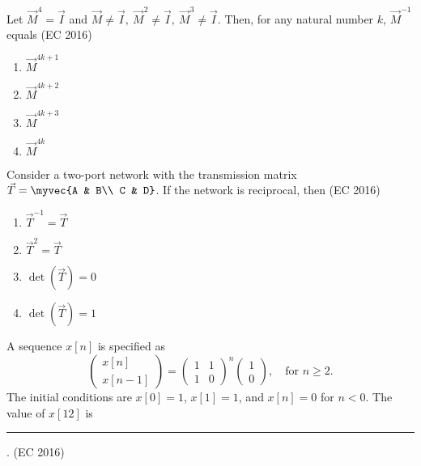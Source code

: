 \item Let $\vec{M}^4 = \vec{I}$  and $\vec{M} \neq \vec{I},\ \vec{M}^2 \neq \vec{I},\ \vec{M}^3 \neq \vec{I}$. Then, for any natural number $k$, $\vec{M}^{-1}$ equals
\hfill(EC 2016)

\begin{multicols}{4}
\begin{enumerate}
    \item $\vec{M}^{4k+1}$
    \item $\vec{M}^{4k+2}$
    \item $\vec{M}^{4k+3}$
    \item $\vec{M}^{4k}$
\end{enumerate}
\end{multicols}
\item Consider a two-port network with the transmission matrix $\vec{T}=\myvec{A & B\\ C & D}$. If the network is reciprocal, then
 \hfill(EC 2016)
\begin{multicols}{4}
\begin{enumerate}
    \item $\vec{T}^{-1}=\vec{T}$
    \item $\vec{T}^2 = \vec{T}$
    \item \(\det(\vec{T})=0\)
    \item \(\det(\vec{T})=1\)
\end{enumerate}
\end{multicols}
\item A sequence $x[n]$ is specified as
\[
\begin{pmatrix} x[n] \\ x[n-1] \end{pmatrix}
=
\begin{pmatrix} 1 & 1 \\ 1 & 0 \end{pmatrix}^n
\begin{pmatrix} 1 \\ 0 \end{pmatrix}, \quad \text{for } n\ge 2.
\]
The initial conditions are $x[0]=1$, $x[1]=1$, and $x[n]=0$ for $n<0$. The value of $x[12]$ is \rule{3cm}{0.4pt}.
\hfill(EC 2016)

